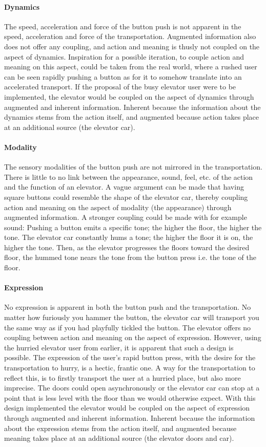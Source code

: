 \paragraph{Dynamics} The speed, acceleration and force of the button push is not apparent in the speed, acceleration and force of the transportation. Augmented information also does not offer any coupling, and action and meaning is thusly not coupled on the aspect of dynamics. Inspiration for a possible iteration, to couple action and meaning on this aspect, could be taken from the real world, where a rushed user can be seen rapidly pushing a button as for it to somehow translate into an accelerated transport. If the proposal of the busy elevator user were to be implemented, the elevator would be coupled on the aspect of dynamics through augmented and inherent information. Inherent because the information about the dynamics stems from the action itself, and augmented because action takes place at an additional source (the elevator car).
\paragraph{Modality} The sensory modalities of the button push are not mirrored in the transportation. There is little to no link between the appearance, sound, feel, etc. of the action and the function of an elevator. A vague argument can be made that having square buttons could resemble the shape of the elevator car, thereby coupling action and meaning on the aspect of modality (the appearance) through augmented information. A stronger coupling could be made with for example sound: Pushing a button emits a specific tone; the higher the floor, the higher the tone. The elevator car constantly hums a tone; the higher the floor it is on, the higher the tone. Then, as the elevator progresses the floors toward the desired floor, the hummed tone nears the tone from the button press i.e. the tone of the floor.
\paragraph{Expression} No expression is apparent in both the button push and the transportation. No matter how furiously you hammer the button, the elevator car will transport you the same way as if you had playfully tickled the button. The elevator offers no coupling between action and meaning on the aspect of expression. However, using the hurried elevator user from earlier, it is apparent that such a design is possible. The expression of the user's rapid button press, with the desire for the transportation to hurry, is a hectic, frantic one. A way for the transportation to reflect this, is to firstly transport the user at a hurried place, but also more imprecise. The doors could open asynchronously or the elevator car can stop at a point that is less level with the floor than we would otherwise expect. With this design implemented the elevator would be coupled on the aspect of expression through augmented and inherent information. Inherent because the information about the expression stems from the action itself, and augmented because meaning takes place at an additional source (the elevator doors and car).

